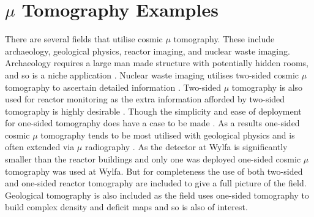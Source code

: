 \section{$\mu$ Tomography Examples} \label{sec:muTomographyExamples}
There are several fields that utilise cosmic $\mu$ tomography. These include archaeology, geological physics, reactor imaging, and nuclear waste imaging. Archaeology requires a large man made structure with potentially hidden rooms, and so is a niche application \cite{Alvarez_Pyramids_1970}. Nuclear waste imaging utilises two-sided cosmic $\mu$ tomography to ascertain detailed information \cite{jonkmans2013nuclear}. Two-sided $\mu$ tomography is also used for reactor monitoring as the extra information afforded by two-sided tomography is highly desirable \cite{miyadera2013imaging} \cite{perry_imaging_2013} \cite{morris2014analysis}. Though the simplicity and ease of deployment for one-sided tomography does have a case to be made \cite{Erlandson_reactorOST_2018} \cite{Fujii_ReactorRadiography_2019}. As a results one-sided cosmic $\mu$ tomography tends to be most utilised with geological physics and is often extended via $\mu$ radiography \cite{Tanaka_mtAsama_2007} \cite{Marteau_2017}. As the detector at Wylfa is significantly smaller than the reactor buildings and only one was deployed one-sided cosmic $\mu$ tomography was used at Wylfa. But for completeness the use of both two-sided and one-sided reactor tomography are included to give a full picture of the field. Geological tomography is also included as the field uses one-sided tomography to build complex density and deficit maps and so is also of interest. 

